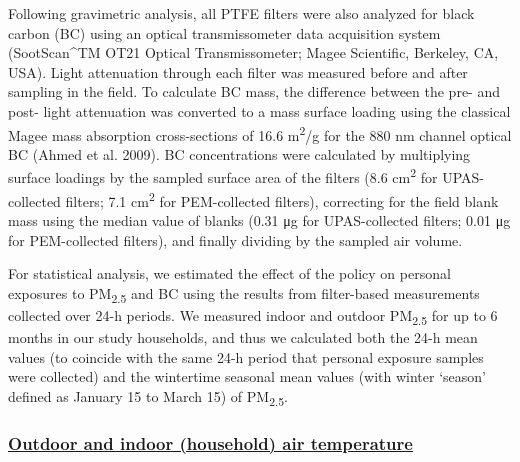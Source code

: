 \documentclass[
  letterpaper,
  DIV=11,
  numbers=noendperiod]{scrartcl}
\providecommand{\DIFadd}[1]{{\protect\color{blue}\underline{#1}}} %
\providecommand{\DIFaddbegin}{} %
\providecommand{\DIFaddend}{} %
\providecommand{\DIFdelbegin}{} %
\providecommand{\DIFdelend}{} %
\newcommand{\DIFscaledelfig}{0.5}
\newlength{\DIFdelgraphicswidth} %
\newlength{\DIFdelgraphicsheight} %
\newcommand{\DIFaddincludegraphics}[2][]{{\color{blue}\fbox{\DIFOincludegraphics[#1]{#2}}}} %
\newcommand{\DIFdelincludegraphics}[2][]{%
\sbox{\DIFdelgraphicsbox}{\DIFOincludegraphics[#1]{#2}}%
\settoboxwidth{\DIFdelgraphicswidth}{\DIFdelgraphicsbox} %
\settoboxtotalheight{\DIFdelgraphicsheight}{\DIFdelgraphicsbox} %
\scalebox{\DIFscaledelfig}{%
\parbox[b]{\DIFdelgraphicswidth}{\usebox{\DIFdelgraphicsbox}\\[-\baselineskip] \rule{\DIFdelgraphicswidth}{0em}}\llap{\resizebox{\DIFdelgraphicswidth}{\DIFdelgraphicsheight}{%
\setlength{\unitlength}{\DIFdelgraphicswidth}%
\begin{picture}(1,1)%
\thicklines\linethickness{2pt} %
{\color[rgb]{1,0,0}\put(0,0){\framebox(1,1){}}}%
{\color[rgb]{1,0,0}\put(0,0){\line( 1,1){1}}}%
{\color[rgb]{1,0,0}\put(0,1){\line(1,-1){1}}}%
\end{picture}%
}\hspace*{3pt}}} %
} %
\DeclareRobustCommand{\DIFaddbegin}{\DIFOaddbegin \let\includegraphics\DIFaddincludegraphics} %
\DeclareRobustCommand{\DIFaddend}{\DIFOaddend \let\includegraphics\DIFOincludegraphics} %
\DeclareRobustCommand{\DIFdelbegin}{\DIFOdelbegin \let\includegraphics\DIFdelincludegraphics} %
\DeclareRobustCommand{\DIFdelend}{\DIFOaddend \let\includegraphics\DIFOincludegraphics} %
\begin{document}
Following gravimetric analysis, all PTFE filters were also analyzed for
black carbon (BC) using an optical transmissometer data acquisition
system (SootScan\^{}TM OT21 Optical Transmissometer; Magee Scientific,
Berkeley, CA, USA). Light attenuation through each filter was measured
before and after sampling in the field. To calculate BC mass, the
difference between the pre- and post- light attenuation was converted to
a mass surface loading using the classical Magee mass absorption
cross-sections of 16.6 m\textsuperscript{2}/g for the 880 nm channel
optical BC (Ahmed et al. 2009). BC concentrations were calculated by
multiplying surface loadings by the sampled surface area of the filters
(8.6 cm\textsuperscript{2} for UPAS-collected filters; 7.1
cm\textsuperscript{2} for PEM-collected filters), correcting for the
field blank mass using the median value of blanks (0.31 μg for
UPAS-collected filters; 0.01 μg for PEM-collected filters), and finally
dividing by the sampled air volume.

For statistical analysis, we estimated the effect of the policy on
personal exposures to PM\textsubscript{2.5} and BC using the results
from filter-based measurements collected over 24-h periods. We measured
indoor and outdoor PM\textsubscript{2.5} for up to 6 months in our study
households, and thus we calculated both the 24-h mean values (to
coincide with the same 24-h period that personal exposure samples were
collected) and the wintertime seasonal mean values (with winter `season'
defined as January 15 to March 15) of PM\textsubscript{2.5}.

\DIFdelbegin %
\DIFdelend \DIFaddbegin \subsubsection{\DIFadd{Outdoor and indoor (household) air
temperature}}\label{outdoor-and-indoor-household-air-temperature}
\DIFaddend 
\end{document}
